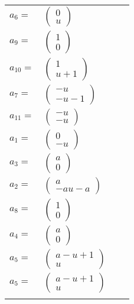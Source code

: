 \documentclass[1p]{elsarticle_modified}
\theoremstyle{definition}
\begin{document}
\begin{tabular}{m{7pt} m{180pt} m{7pt} m{180pt} }
\flushright $a_{6}=$&$\begin{pmatrix}0\\u\end{pmatrix}$ \\
\flushright $a_{9}=$&$\begin{pmatrix}1\\0\end{pmatrix}$ \\
\flushright $a_{10}=$&$\begin{pmatrix}1\\u+1\end{pmatrix}$ \\
\flushright $a_{7}=$&$\begin{pmatrix}- u\\- u-1\end{pmatrix}$ \\
\flushright $a_{11}=$&$\begin{pmatrix}- u\\- u\end{pmatrix}$ \\
\flushright $a_{1}=$&$\begin{pmatrix}0\\- u\end{pmatrix}$ \\
\flushright $a_{3}=$&$\begin{pmatrix}a\\0\end{pmatrix}$ \\
\flushright $a_{2}=$&$\begin{pmatrix}a\\- a u- a\end{pmatrix}$ \\
\flushright $a_{8}=$&$\begin{pmatrix}1\\0\end{pmatrix}$ \\
\flushright $a_{4}=$&$\begin{pmatrix}a\\0\end{pmatrix}$ \\
\flushright $a_{5}=$&$\begin{pmatrix}a- u+1\\u\end{pmatrix}$\\ \flushright $a_{5}=$&$\begin{pmatrix}a- u+1\\u\end{pmatrix}$\\&\end{tabular}
\end{document}
